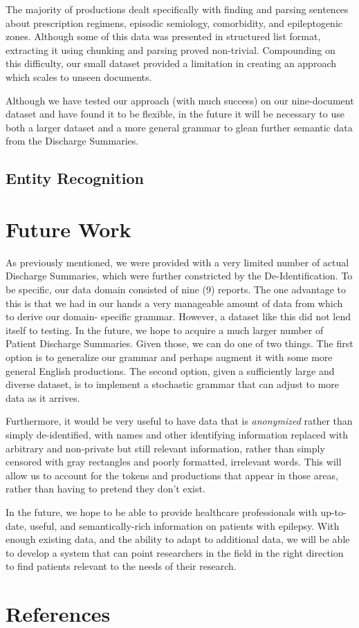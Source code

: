 \documentclass{acm_proc_article-sp}
\begin{document}
The majority of productions dealt specifically with finding and parsing
sentences about prescription regimens, episodic semiology, comorbidity, and epileptogenic
zones. Although some of this data was presented in structured list format, extracting it using
chunking and parsing proved non-trivial. Compounding on this difficulty, our 
small dataset provided a limitation in creating an approach which scales to unseen documents.

Although we have tested our approach (with much success) on our nine-document dataset and have found it
to be flexible, in the future it will be necessary
to use both a larger dataset and a more general grammar to glean further semantic
data from the Discharge Summaries.
\subsection{Entity Recognition}
\section{Future Work}
As previously mentioned, we were provided with a very limited number of actual Discharge
Summaries, which were further constricted by the De-Identification. To be specific,
our data domain consisted of nine (9) reports. The one advantage to this is that we
had in our hands a very manageable amount of data from which to derive our domain-
specific grammar. However, a dataset like this did not lend itself to testing. In
the future, we hope to acquire a much larger number of Patient Discharge Summaries.
Given those, we can do one of two things. The first option is to generalize our grammar
and perhaps augment it with some more general English productions. The second option,
given a sufficiently large and diverse dataset, is to implement a stochastic grammar
that can adjust to more data as it arrives.

Furthermore, it would be very useful to have data that is \emph{anonymized} rather
than simply de-identified, with names and other identifying information replaced
with arbitrary and non-private but still relevant information, rather than simply
censored with gray rectangles and poorly formatted, irrelevant words. This will allow
us to account for the tokens and productions that appear in those areas, rather than
having to pretend they don't exist.

In the future, we hope to be able to provide healthcare professionals with up-to-date,
useful, and semantically-rich information on patients with epilepsy. With enough
existing data, and the ability to adapt to additional data, we will be able to develop
a system that can point researchers in the field in the right direction to find patients
relevant to the needs of their research.
\section{References}
{}

\end{document}
